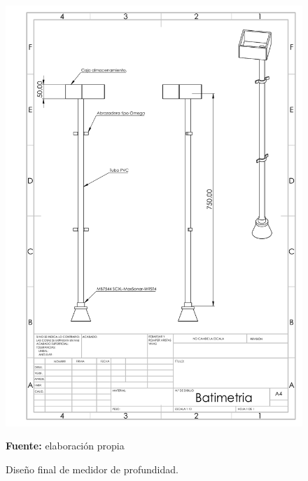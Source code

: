 \begin{figure}[H]
\centering
\includegraphics[width=0.9\linewidth]{Imagenes/cap3/Batimetria.pdf}
\caption{Dise\~no final de medidor de profundidad. }{\textbf{Fuente:} elaboración propia}
\label{fig:batimetro}
\end{figure}

